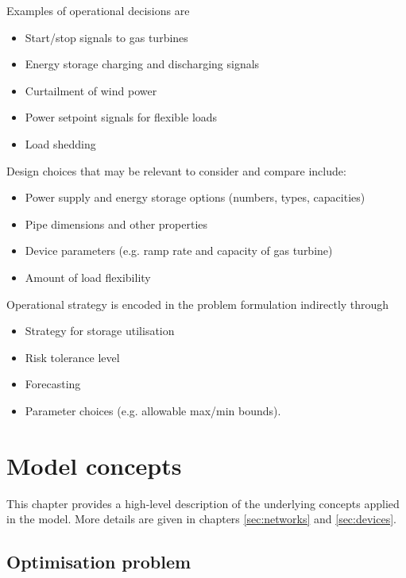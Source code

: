 \documentclass[12pt]{article}
\begin{document}
\medskip\noindent
Examples of operational decisions are
\begin{itemize}
	\item Start/stop signals to gas turbines
	\item Energy storage charging and discharging signals
	\item Curtailment of wind power
	\item Power setpoint signals for flexible loads
	\item Load shedding
\end{itemize}

\medskip\noindent
Design choices that may be relevant to consider and compare include:
\begin{itemize}
	\item Power supply and energy storage options (numbers, types, capacities)
	\item Pipe dimensions and other properties
	\item Device parameters (e.g. ramp rate and capacity of gas turbine)
	\item Amount of load flexibility
\end{itemize}

\medskip\noindent
Operational strategy is encoded in the problem formulation indirectly through
\begin{itemize}
	\item Strategy for storage utilisation
	\item Risk tolerance level
	\item Forecasting
	\item Parameter choices (e.g. allowable max/min bounds).
\end{itemize}





\section{Model concepts}

This chapter provides a high-level description of the underlying concepts applied in the model. More details are given in chapters \ref{sec:networks} and \ref{sec:devices}.


\subsection{Optimisation problem}
\end{document}
